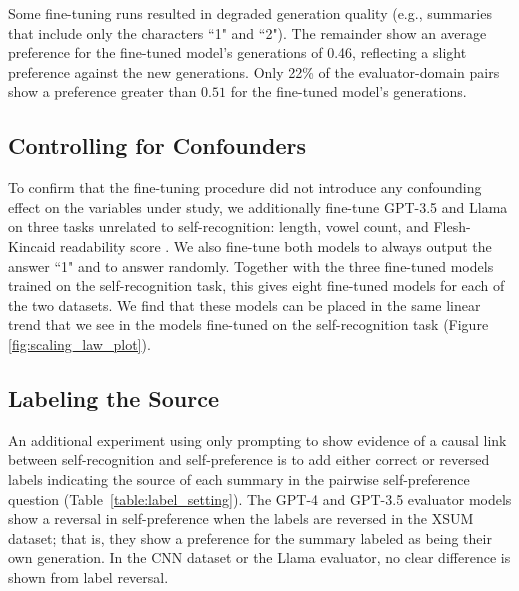 \documentclass{article}
\theoremstyle{plain}
\theoremstyle{definition}
\theoremstyle{remark}
\begin{document}
Some fine-tuning runs resulted in degraded generation quality (e.g., summaries that include only the characters ``1" and ``2"). The remainder show an average preference for the fine-tuned model's generations of 0.46, reflecting a slight preference against the new generations. Only 22\% of the evaluator-domain pairs show a preference greater than $0.51$ for the fine-tuned model's generations. %

\subsection{Controlling for Confounders}
\label{sec:confounders}

To confirm that the fine-tuning procedure did not introduce any confounding effect on the variables under study, we additionally fine-tune GPT-3.5 and Llama on three tasks unrelated to self-recognition: length, vowel count, and Flesh-Kincaid readability score \citep{fleschNewReadabilityYardstick1948}. We also fine-tune both models to always output the answer ``1" and to answer randomly. Together with the three fine-tuned models trained on the self-recognition task, this gives eight fine-tuned models for each of the two datasets. We find that these models can be placed in the same linear trend that we see in the models fine-tuned on the self-recognition task (Figure \ref{fig:scaling_law_plot}).


\subsection{Labeling the Source}
\label{sec:labeling_authors}

An additional experiment using only prompting to show evidence of a causal link between self-recognition and self-preference is to add either correct or reversed labels indicating the source of each summary in the pairwise self-preference question (Table~\ref{table:label_setting}). The GPT-4 and GPT-3.5 evaluator models show a reversal in self-preference when the labels are reversed in the XSUM dataset; that is, they show a preference for the summary labeled as being their own generation. In the CNN dataset or the Llama evaluator, no clear difference is shown from label reversal.
\end{document}
